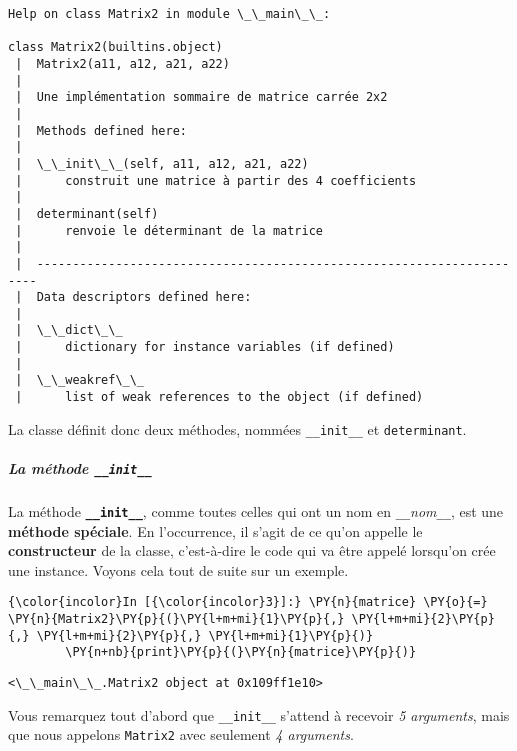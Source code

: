     \begin{Verbatim}[commandchars=\\\{\},frame=single,framerule=0.3mm,rulecolor=\color{cellframecolor}]
Help on class Matrix2 in module \_\_main\_\_:

class Matrix2(builtins.object)
 |  Matrix2(a11, a12, a21, a22)
 |  
 |  Une implémentation sommaire de matrice carrée 2x2
 |  
 |  Methods defined here:
 |  
 |  \_\_init\_\_(self, a11, a12, a21, a22)
 |      construit une matrice à partir des 4 coefficients
 |  
 |  determinant(self)
 |      renvoie le déterminant de la matrice
 |  
 |  ----------------------------------------------------------------------
 |  Data descriptors defined here:
 |  
 |  \_\_dict\_\_
 |      dictionary for instance variables (if defined)
 |  
 |  \_\_weakref\_\_
 |      list of weak references to the object (if defined)
\end{Verbatim}

    La classe définit donc deux méthodes, nommées \texttt{\_\_init\_\_} et
\texttt{determinant}.

    \hypertarget{la-muxe9thode-__init__}{%
\subparagraph{\texorpdfstring{La méthode
\texttt{\_\_init\_\_}}{La méthode \_\_init\_\_}}\label{la-muxe9thode-__init__}}

    La méthode \textbf{\texttt{\_\_init\_\_}}, comme toutes celles qui ont
un nom en \texttt{\_\_}\emph{nom}\texttt{\_\_}, est une \textbf{méthode
spéciale}. En l'occurrence, il s'agit de ce qu'on appelle le
\textbf{constructeur} de la classe, c'est-à-dire le code qui va être
appelé lorsqu'on crée une instance. Voyons cela tout de suite sur un
exemple.

    \begin{Verbatim}[commandchars=\\\{\},frame=single,framerule=0.3mm,rulecolor=\color{cellframecolor}]
{\color{incolor}In [{\color{incolor}3}]:} \PY{n}{matrice} \PY{o}{=} \PY{n}{Matrix2}\PY{p}{(}\PY{l+m+mi}{1}\PY{p}{,} \PY{l+m+mi}{2}\PY{p}{,} \PY{l+m+mi}{2}\PY{p}{,} \PY{l+m+mi}{1}\PY{p}{)}
        \PY{n+nb}{print}\PY{p}{(}\PY{n}{matrice}\PY{p}{)}
\end{Verbatim}


    \begin{Verbatim}[commandchars=\\\{\},frame=single,framerule=0.3mm,rulecolor=\color{cellframecolor}]
<\_\_main\_\_.Matrix2 object at 0x109ff1e10>
\end{Verbatim}

    Vous remarquez tout d'abord que \texttt{\_\_init\_\_} s'attend à
recevoir \emph{5 arguments}, mais que nous appelons \texttt{Matrix2}
avec seulement \emph{4 arguments}.


